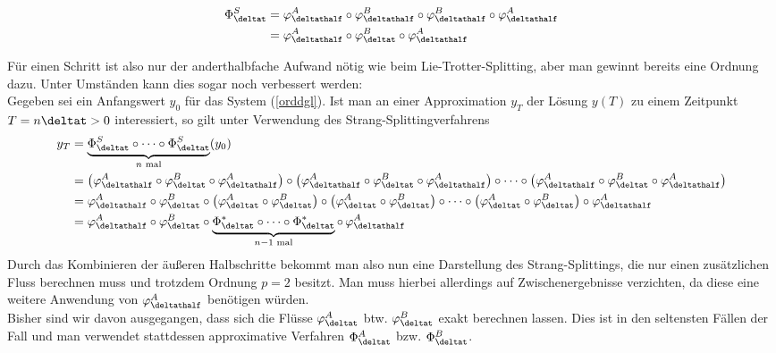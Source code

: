 \noindent\begin{minipage}{0.3\textwidth}

\end{minipage}%
\hfill%
\begin{minipage}{0.7\textwidth}
\begin{align}
\Phi_{\deltat}^S&=\varphi_{\deltathalf}^A\circ\varphi_{\deltathalf}^B\circ\varphi_{\deltathalf}^B\circ\varphi_{\deltathalf}^A\nonumber\\
&=\varphi_{\deltathalf}^A\circ\varphi_{\deltat}^B\circ\varphi_{\deltathalf}^A
\end{align}
\end{minipage}
Für einen Schritt ist also nur der anderthalbfache Aufwand nötig wie beim Lie-Trotter-Splitting, aber man gewinnt bereits eine Ordnung dazu. Unter Umständen kann dies sogar noch verbessert werden:\\
Gegeben sei ein Anfangswert $y_0$ für das System (\ref{orddgl}). Ist man an einer Approximation $y_T$ der Lösung $y(T)$ zu einem Zeitpunkt $T=n\deltat>0$ interessiert, so gilt unter Verwendung des Strang-Splittingverfahrens
\begin{align*}
y_T&=\underbrace{\Phi_{\deltat}^S\circ\dots\circ\Phi_{\deltat}^S}_{n\text{ mal}}(y_0)\\
&=\left(\varphi_{\deltathalf}^A\circ\varphi_{\deltat}^B\circ\varphi_{\deltathalf}^A\right)\circ\left(
\varphi_{\deltathalf}^A\circ\varphi_{\deltat}^B\circ\varphi_{\deltathalf}^A\right)\circ\dots\circ\left(
\varphi_{\deltathalf}^A\circ\varphi_{\deltat}^B\circ\varphi_{\deltathalf}^A\right)\\
&=\varphi_{\deltathalf}^A\circ\varphi_{\deltat}^B\circ\left(\varphi_{\deltat}^A\circ\varphi_{\deltat}^B\right)\circ\left(\varphi_{\deltat}^A\circ\varphi_{\deltat}^B\right)\circ\dots\circ\left(\varphi_{\deltat}^A\circ\varphi_{\deltat}^B\right)\circ\varphi_{\deltathalf}^A\\
&=\varphi_{\deltathalf}^A\circ\varphi_{\deltat}^B\circ
\underbrace{\Phi_{\deltat}^*\circ\dots\circ\Phi_{\deltat}^*}_{n-1\text{ mal}}\circ\,\varphi_{\deltathalf}^A
\end{align*}
Durch das Kombinieren der äußeren Halbschritte bekommt man also nun eine Darstellung des Strang-Splittings, die nur einen zusätzlichen Fluss berechnen muss und trotzdem Ordnung $p=2$ besitzt. Man muss hierbei allerdings auf Zwischenergebnisse verzichten, da diese eine weitere Anwendung von $\varphi_{\deltathalf}^A$ benötigen würden.\\[0.5cm]
Bisher sind wir davon ausgegangen, dass sich die Flüsse $\varphi_{\deltat}^A$ btw. $\varphi_{\deltat}^B$ exakt berechnen lassen. Dies ist in den seltensten Fällen der Fall und man verwendet stattdessen approximative Verfahren $\Phi_{\deltat}^A$ bzw. $\Phi_{\deltat}^B$. 
